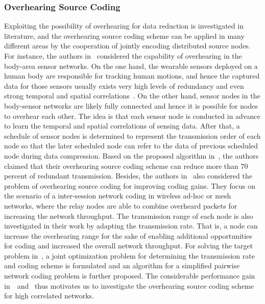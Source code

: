 \subsubsection{Overhearing Source Coding}
Exploiting the possibility of overhearing for data reduction is investigated in literature, and the overhearing source coding scheme can be applied in many different areas by the cooperation of jointly encoding distributed source nodes.
%
For instance, the authors in~\cite{BodyAreaSensorNetwork} considered the capability of overhearing in the body-area sensor networks.
On the one hand, the wearable sensors deployed on a human body are responsible for tracking human motions, and hence the captured data for those sensors usually exists very high levels of redundancy and even strong temporal and spatial correlations~\cite{SpatialCorrInBodySensorNetwork}.
On the other hand, sensor nodes in the body-sensor networks are likely fully connected and hence it is possible for nodes to overhear each other.
The idea is that each sensor node is conducted in advance to learn the temporal and spatial correlations of sensing data.
After that, a schedule of sensor nodes is determined to represent the transmission order of each node so that the later scheduled node can refer to the data of previous scheduled node during data compression.
Based on the proposed algorithm in~\cite{BodyAreaSensorNetwork}, the authors claimed that their overhearing source coding scheme can reduce more than 70 percent of redundant transmission.
%
Besides, the authors in~\cite{InterSessionCoding} also considered the problem of overhearing source coding for improving coding gains.
They focus on the scenario of a inter-session network coding in wireless ad-hoc or mesh networks, where the relay nodes are able to combine overheard packets for increasing the network throughput.
The transmission range of each node is also investigated in their work by adapting the transmission rate.
That is, a node can increase the overhearing range for the sake of enabling additional opportunities for coding and increased the overall network throughput.
For solving the target problem in~\cite{InterSessionCoding}, a joint optimization problem for determining the transmission rate and coding scheme is formulated and an algorithm for a simplified pairwise network coding problem is further proposed.
%
The considerable performance gain in~\cite{BodyAreaSensorNetwork}~and~\cite{InterSessionCoding} thus motivates us to investigate the overhearing source coding scheme for high correlated networks.
%
